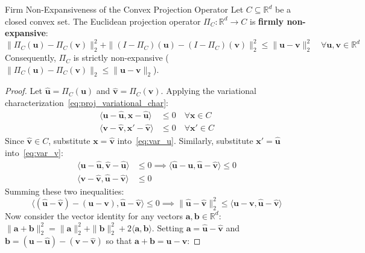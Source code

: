 \begin{theorembox}{Firm Non-Expansiveness of the Convex Projection Operator}
Let $C \subseteq \mathbb{R}^d$ be a closed convex set. The Euclidean projection operator $\Pi_C: \mathbb{R}^d \to C$ is \textbf{firmly non-expansive}:
\begin{equation}
\|\Pi_C(\mathbf{u}) - \Pi_C(\mathbf{v})\|_2^2 + \|(I - \Pi_C)(\mathbf{u}) - (I - \Pi_C)(\mathbf{v})\|_2^2 \le \|\mathbf{u} - \mathbf{v}\|_2^2 \quad \forall \mathbf{u}, \mathbf{v} \in \mathbb{R}^d
\label{eq:firm_non_expansive}
\end{equation}
Consequently, $\Pi_C$ is strictly non-expansive ($\|\Pi_C(\mathbf{u}) - \Pi_C(\mathbf{v})\|_2 \le \|\mathbf{u} - \mathbf{v}\|_2$).
\end{theorembox}

\begin{proof}
Let $\hat{\mathbf{u}} = \Pi_C(\mathbf{u})$ and $\hat{\mathbf{v}} = \Pi_C(\mathbf{v})$. Applying the variational characterization~\eqref{eq:proj_variational_char}:
\begin{align}
\langle \mathbf{u} - \hat{\mathbf{u}}, \mathbf{x} - \hat{\mathbf{u}} \rangle &\le 0 \quad \forall \mathbf{x} \in C \label{eq:var_u} \\
\langle \mathbf{v} - \hat{\mathbf{v}}, \mathbf{x}' - \hat{\mathbf{v}} \rangle &\le 0 \quad \forall \mathbf{x}' \in C \label{eq:var_v}
\end{align}
Since $\hat{\mathbf{v}} \in C$, substitute $\mathbf{x} = \hat{\mathbf{v}}$ into~\eqref{eq:var_u}. Similarly, substitute $\mathbf{x}' = \hat{\mathbf{u}}$ into~\eqref{eq:var_v}:
\begin{align}
\langle \mathbf{u} - \hat{\mathbf{u}}, \hat{\mathbf{v}} - \hat{\mathbf{u}} \rangle &\le 0 \implies \langle \hat{\mathbf{u}} - \mathbf{u}, \hat{\mathbf{u}} - \hat{\mathbf{v}} \rangle \le 0 \\
\langle \mathbf{v} - \hat{\mathbf{v}}, \hat{\mathbf{u}} - \hat{\mathbf{v}} \rangle &\le 0
\end{align}
Summing these two inequalities:
\begin{equation}
\langle (\hat{\mathbf{u}} - \hat{\mathbf{v}}) - (\mathbf{u} - \mathbf{v}), \hat{\mathbf{u}} - \hat{\mathbf{v}} \rangle \le 0 \implies \|\hat{\mathbf{u}} - \hat{\mathbf{v}}\|_2^2 \le \langle \mathbf{u} - \mathbf{v}, \hat{\mathbf{u}} - \hat{\mathbf{v}} \rangle
\label{eq:firm_step}
\end{equation}
Now consider the vector identity for any vectors $\mathbf{a}, \mathbf{b} \in \mathbb{R}^d$: $\|\mathbf{a} + \mathbf{b}\|_2^2 = \|\mathbf{a}\|_2^2 + \|\mathbf{b}\|_2^2 + 2\langle \mathbf{a}, \mathbf{b} \rangle$. Setting $\mathbf{a} = \hat{\mathbf{u}} - \hat{\mathbf{v}}$ and $\mathbf{b} = (\mathbf{u} - \hat{\mathbf{u}}) - (\mathbf{v} - \hat{\mathbf{v}})$ so that $\mathbf{a} + \mathbf{b} = \mathbf{u} - \mathbf{v}$:

\end{proof}
